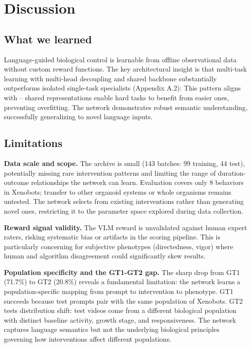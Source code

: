 \documentclass{article}
\begin{document}
\section{Discussion}
\label{sec:Discussion}

\subsection{What we learned}
\label{sec:learned}

Language-guided biological control is learnable from offline observational 
data without custom reward functions. The key architectural insight is that 
multi-task learning with multi-head decoupling and shared backbone 
substantially outperforms isolated single-task specialists (Appendix A.2): This pattern aligns with \cite{caruana1997multitask} -- shared representations enable hard tasks to benefit from easier ones, preventing 
overfitting. The network demonstrates robust semantic understanding, 
successfully generalizing to novel language inputs.

\subsection{Limitations}
\label{sec:limitations}

\textbf{Data scale and scope.} The archive is small (143 batches: 99 training, 44 test), potentially missing rare intervention patterns and limiting the range of duration-outcome relationships the network can learn. Evaluation covers only 8 behaviors in Xenobots; transfer to other organoid systems or whole organisms remains untested. The network selects from existing interventions rather than generating novel ones, restricting it to the parameter space explored during data collection.

\textbf{Reward signal validity.} The VLM reward is unvalidated against human expert raters, risking systematic bias or artifacts in the scoring pipeline. This is particularly concerning for subjective phenotypes (directedness, vigor) where human and algorithm disagreement could significantly skew results.

\textbf{Population specificity and the GT1-GT2 gap.} The sharp drop from 
GT1 (71.7\%) to GT2 (20.8\%) reveals a fundamental limitation: the network 
learns a population-specific mapping from prompt to intervention to phenotype. GT1 succeeds because test prompts pair with the same population of Xenobots. GT2 tests distribution shift: test videos come from a different biological population with distinct baseline activity, growth stage, and responsiveness. The network captures language semantics but not the underlying biological principles governing how interventions affect different populations.
\end{document}
